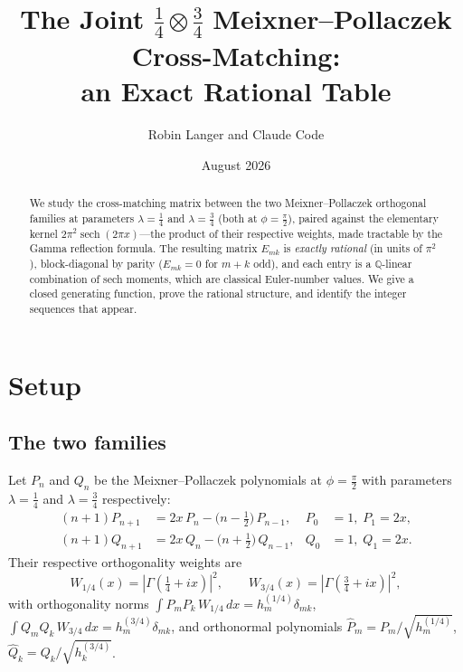 \documentclass[11pt,a4paper]{article}
\title{\textbf{The Joint $\tfrac{1}{4}\otimes\tfrac{3}{4}$
Meixner--Pollaczek Cross-Matching:\\
an Exact Rational Table}}
\author{Robin Langer and Claude Code}
\date{August 2026}
\newcommand{\Q}{\mathbb{Q}}
\begin{document}
\maketitle

\begin{abstract}
We study the cross-matching matrix between the two
Meixner--Pollaczek orthogonal families at parameters
$\lambda = \tfrac14$ and $\lambda = \tfrac34$ (both at
$\phi = \tfrac\pi2$), paired against the elementary kernel
$2\pi^2\operatorname{sech}(2\pi x)$---the product of their
respective weights, made tractable by the Gamma reflection
formula. The resulting matrix $E_{mk}$ is \emph{exactly rational}
(in units of $\pi^2$), block-diagonal by parity ($E_{mk} = 0$
for $m+k$ odd), and each entry is a $\Q$-linear combination of
sech moments, which are classical Euler-number values. We give a
closed generating function, prove the rational structure, and
identify the integer sequences that appear.
\end{abstract}

\section{Setup}

\subsection{The two families}

Let $P_n$ and $Q_n$ be the Meixner--Pollaczek polynomials at
$\phi = \tfrac\pi2$ with parameters $\lambda = \tfrac14$ and
$\lambda = \tfrac34$ respectively:
\begin{align}
  (n+1)P_{n+1} &= 2x\,P_n - \bigl(n - \tfrac12\bigr)\,P_{n-1},
    &P_0 &= 1,\; P_1 = 2x, \label{eq:recP}\\
  (n+1)Q_{n+1} &= 2x\,Q_n - \bigl(n + \tfrac12\bigr)\,Q_{n-1},
    &Q_0 &= 1,\; Q_1 = 2x. \label{eq:recQ}
\end{align}
Their respective orthogonality weights are
\[
  W_{1/4}(x) = |\Gamma(\tfrac14 + ix)|^2, \qquad
  W_{3/4}(x) = |\Gamma(\tfrac34 + ix)|^2,
\]
with orthogonality norms
$\int P_m P_k\, W_{1/4}\, dx = h_m^{(1/4)}\delta_{mk}$,
$\int Q_m Q_k\, W_{3/4}\, dx = h_m^{(3/4)}\delta_{mk}$,
and orthonormal polynomials
$\widehat{P}_m = P_m/\sqrt{h_m^{(1/4)}}$,
$\widehat{Q}_k = Q_k/\sqrt{h_k^{(3/4)}}$.
\end{document}
